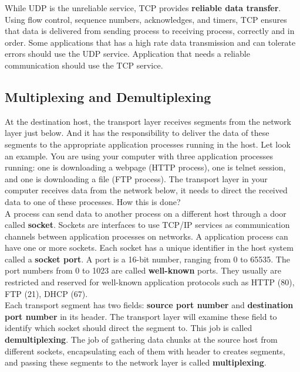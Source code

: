 \documentclass[a4paper, 11pt]{article}
\begin{document}
While UDP is the unreliable service, TCP provides \textbf{reliable data transfer}. Using flow control, sequence numbers, acknowledges, and timers, TCP ensures that data is delivered from sending process to receiving process, correctly and in order. Some applications that has a high rate data transmission and can tolerate errors should use the UDP service. Application that needs a reliable communication should use the TCP service.

\subsection{Multiplexing and Demultiplexing} \label{multiplexing}

At the destination host, the transport layer receives segments from the network layer just below. And it has the responsibility to deliver the data of these segments to the appropriate application processes running in the host. Let look an example. You are using your computer with three application processes running: one is downloading a webpage (HTTP process), one is telnet session, and one is downloading a file (FTP process). The transport layer in your computer receives data from the network below, it needs to direct the received data to one of these processes. How this is done?\\

A process can send data to another process on a different host through a door called \textbf{socket}. Sockets are interfaces to use TCP/IP services as communication channels between application processes on networks. A application process can have one or more sockets. Each socket has a unique identifier in the host system called a \textbf{socket port}. A port is a 16-bit number, ranging from 0 to  65535. The port numbers from 0 to 1023 are called \textbf{well-known} ports. They usually are restricted and reserved for well-known application protocols such as HTTP (80), FTP (21), DHCP (67).\\

Each transport segment has two fields: \textbf{source port number} and \textbf{destination port number} in its header. The transport layer will examine these field to identify which socket should direct the segment to. This job is called \textbf{demultiplexing}. The job of gathering data chunks at the source host from different sockets, encapsulating each of them with header to creates segments, and passing these segments to the network layer is called \textbf{multiplexing}.\\
\end{document}
